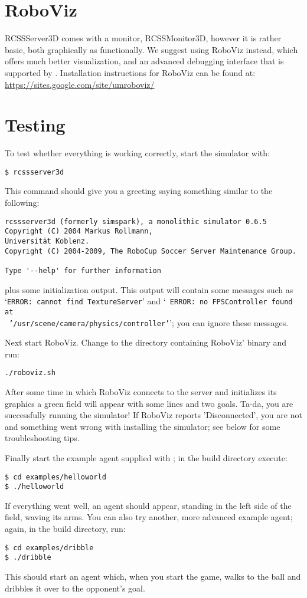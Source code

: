 \section{RoboViz}

RCSSServer3D comes with a monitor, RCSSMonitor3D, however it is rather
basic, both graphically as functionally. We suggest using RoboViz
instead, which offers much better visualization, and an advanced
debugging interface that is supported by \libbats. Installation
instructions for RoboViz can be found at:\\
\url{https://sites.google.com/site/umroboviz/}

\section{Testing}

To test whether everything is working correctly, start the simulator
with:
\begin{verbatim}
$ rcssserver3d
\end{verbatim}
This command should give you a greeting saying something similar to
the following:
\begin{verbatim}
rcssserver3d (formerly simspark), a monolithic simulator 0.6.5
Copyright (C) 2004 Markus Rollmann, 
Universität Koblenz.
Copyright (C) 2004-2009, The RoboCup Soccer Server Maintenance Group.

Type '--help' for further information
\end{verbatim}
plus some initialization output. This output will contain some
messages such as `{\tt ERROR: cannot find TextureServer}' and `{\tt
  ERROR: no FPSController found at}\\{\tt
  '/usr/scene/camera/physics/controller'}'; you can ignore these
messages.

Next start RoboViz. Change to the directory containing RoboViz' binary
and run:
\begin{verbatim}
./roboviz.sh
\end{verbatim}
After some time in which RoboViz connects to the server and
initializes its graphics a green field will appear with some lines and
two goals. Ta-da, you are successfully running the simulator! If
RoboViz reports 'Disconnected', you are not and something went wrong
with installing the simulator; see below for some troubleshooting
tips.

Finally start the example agent supplied with \libbats; in the
\libbats build directory execute:
\begin{verbatim}
$ cd examples/helloworld
$ ./helloworld
\end{verbatim}
If everything went well, an agent should appear, standing in the left
side of the field, waving its arms. You can also try another, more
advanced example agent; again, in the \libbats build directory, run:
\begin{verbatim}
$ cd examples/dribble
$ ./dribble
\end{verbatim}
This should start an agent which, when you start the game, walks to
the ball and dribbles it over to the opponent's goal.

